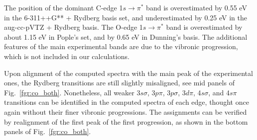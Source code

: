 \documentclass[journal=jctcce,manuscript=article]{achemso}
\begin{document}
The position of the dominant C-edge 1$s\to \pi^\ast$ band  is overestimated by 0.55 eV in the 6-311++G** + Rydberg basis set,
and underestimated by 0.25 eV in the aug-cc-pVTZ + Rydberg basis. 
The O-edge 1$s\to \pi^\ast$ band is overestimated by about 1.15 eV in Pople's set, and by 0.65 eV in Dunning's basis. The additional features of the main experimental bands are due to the vibronic progression, which is not included in our calculations. 

Upon alignment of the computed spectra with the main peak of the experimental ones, the Rydberg transitions are still slightly misaligned, see mid panels of Fig.~\ref{fgr:co_both}.
Nonetheless, all weaker 3$s\sigma$, 3$p\pi$, 3$p\sigma$, 3$d\pi$, 4$s\sigma$, and 4$s\pi$ transitions can be identified in the computed spectra of each edge, thought once again without their finer vibronic progressions. The assignments can be verified by realignment of the first peak of the first progression, as shown in the bottom panels of Fig.~\ref{fgr:co_both}. 

\end{document}
